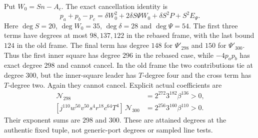 Put $W_0=Sn-A_c$. The exact cancellation identity is
\[
 p_a+p_b-p_c=\delta W_0^2+2\delta S\Psi W_0
              +\delta S^2P+S^2E_\Psi.
\]
Here $\deg S=20$, $\deg W_0=35$, $\deg\delta=28$ and
$\deg\Psi=54$. The first three terms have degrees at most
$98,137,122$ in the rebased frame, with the last bound $124$ in
the old frame. The final term has degree $148$ for $\Psi'_{298}$ and
$150$ for $\Psi'_{300}$. Thus the first inner square has degree $296$
in the rebased case, while $-4p_ap_b$ has exact degree $298$ and cannot
cancel. In the old frame the two contributions tie at degree $300$,
but the inner-square leader has $T$-degree four and the cross term has
$T$-degree two. Again they cannot cancel. Explicit actual coefficients are
\begin{align*}
 [j^{136}w^{46}v^{50}z^6s^6r^{12}c^{40}T^2]\,\mathcal N_{298}
   &=2^{272}3^{182}\beta^{136}>0,\\
 [j^{110}w^{50}v^{50}s^4r^{18}c^{64}T^4]\,\mathcal N_{300}
   &=2^{256}3^{160}\beta^{110}>0.
\end{align*}
Their exponent sums are $298$ and $300$. These are attained degrees at
the authentic fixed tuple, not generic-port degrees or sampled line tests.

